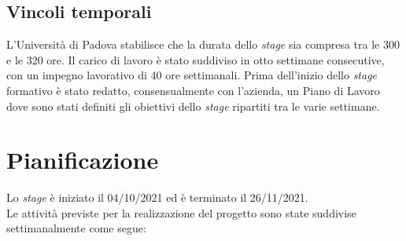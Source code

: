 \subsection{Vincoli temporali}
L'Università di Padova stabilisce che la durata dello \emph{stage} sia compresa tra le 300 e le 320 ore.
Il carico di lavoro è stato suddiviso in otto settimane consecutive, con un impegno lavorativo di 40 ore settimanali.
Prima dell'inizio dello \emph{stage} formativo è stato redatto, consensualmente con l'azienda, un Piano di Lavoro dove sono stati definiti gli obiettivi dello \emph{stage} ripartiti tra le varie settimane.

\section{Pianificazione}
Lo \emph{stage} è iniziato il 04/10/2021 ed è terminato il 26/11/2021. \\
Le attività previste per la realizzazione del progetto sono state suddivise settimanalmente come segue:
